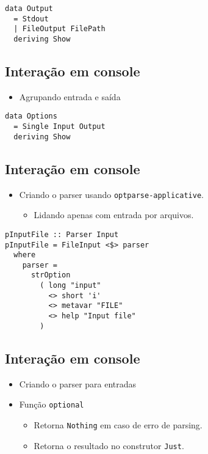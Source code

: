 \documentclass[11pt]{article}
\begin{document}
\begin{verbatim}
data Output
  = Stdout
  | FileOutput FilePath
  deriving Show
\end{verbatim}
\subsection*{Interação em console}
\label{sec:org83fd625}

\begin{itemize}
\item Agrupando entrada e saída
\end{itemize}

\begin{verbatim}
data Options
  = Single Input Output
  deriving Show
\end{verbatim}
\subsection*{Interação em console}
\label{sec:orgc4fb88e}

\begin{itemize}
\item Criando o parser usando \texttt{optparse-applicative}.
\begin{itemize}
\item Lidando apenas com entrada por arquivos.
\end{itemize}
\end{itemize}

\begin{verbatim}
pInputFile :: Parser Input
pInputFile = FileInput <$> parser
  where
    parser =
      strOption
        ( long "input"
          <> short 'i'
          <> metavar "FILE"
          <> help "Input file"
        )
\end{verbatim}
\subsection*{Interação em console}
\label{sec:orgeaed933}

\begin{itemize}
\item Criando o parser para entradas
\item Função \texttt{optional}
\begin{itemize}
\item Retorna \texttt{Nothing} em caso de erro de parsing.
\item Retorna o resultado no construtor \texttt{Just}.
\end{itemize}
\end{itemize}
\end{document}
